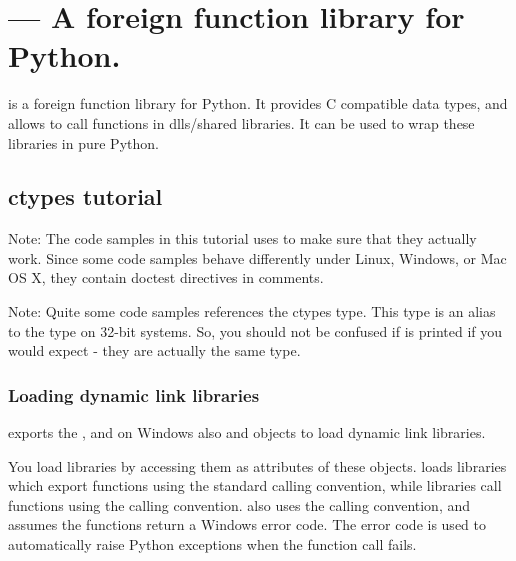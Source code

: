 \ifx\locallinewidth\undefined\newlength{\locallinewidth}\fi
\section{ --- A foreign function library for Python.}

 is a foreign function library for Python.  It provides C
compatible data types, and allows to call functions in dlls/shared
libraries.  It can be used to wrap these libraries in pure Python.


\subsection{ctypes tutorial\label{ctypes-ctypes-tutorial}}

Note: The code samples in this tutorial uses  to make sure
that they actually work.  Since some code samples behave differently
under Linux, Windows, or Mac OS X, they contain doctest directives in
comments.

Note: Quite some code samples references the ctypes  type.
This type is an alias to the  type on 32-bit systems.  So,
you should not be confused if  is printed if you would
expect  - they are actually the same type.


\subsubsection{Loading dynamic link libraries\label{ctypes-loading-dynamic-link-libraries}}

 exports the , and on Windows also  and
 objects to load dynamic link libraries.

You load libraries by accessing them as attributes of these objects.
 loads libraries which export functions using the standard
 calling convention, while  libraries call
functions using the  calling convention.  also
uses the  calling convention, and assumes the functions
return a Windows  error code. The error code is used to
automatically raise  Python exceptions when the
function call fails.

